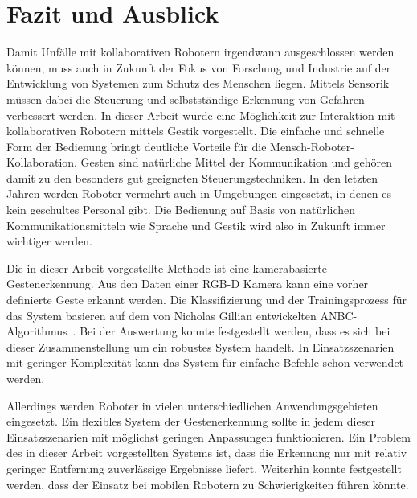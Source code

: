 \chapter{Fazit und Ausblick}
Damit Unfälle mit kollaborativen Robotern irgendwann ausgeschlossen werden können, muss auch in Zukunft der Fokus von Forschung und Industrie auf der Entwicklung von Systemen zum Schutz des Menschen liegen. Mittels Sensorik müssen dabei die Steuerung und selbstständige Erkennung von Gefahren verbessert werden. In dieser Arbeit wurde eine Möglichkeit zur Interaktion mit kollaborativen Robotern mittels Gestik vorgestellt. Die einfache und schnelle Form der Bedienung bringt deutliche Vorteile für die Mensch-Roboter-Kollaboration. Gesten sind natürliche Mittel der Kommunikation und gehören damit zu den besonders gut geeigneten Steuerungstechniken. In den letzten Jahren werden Roboter vermehrt auch in Umgebungen eingesetzt, in denen es kein geschultes Personal gibt. Die Bedienung auf Basis von natürlichen Kommunikationsmitteln wie Sprache und Gestik wird also in Zukunft immer wichtiger werden. 

Die in dieser Arbeit vorgestellte Methode ist eine kamerabasierte Gestenerkennung. Aus den Daten einer RGB-D Kamera kann eine vorher definierte Geste erkannt werden. Die Klassifizierung und der Trainingsprozess für das System basieren auf dem von Nicholas Gillian entwickelten ANBC-Algorithmus~\cite{gillianANBC}. Bei der Auswertung konnte festgestellt werden, dass es sich bei dieser Zusammenstellung um ein robustes System handelt. In Einsatzszenarien mit geringer Komplexität kann das System für einfache Befehle schon verwendet werden.

Allerdings werden Roboter in vielen unterschiedlichen Anwendungsgebieten eingesetzt. Ein flexibles System der Gestenerkennung sollte in jedem dieser Einsatzszenarien mit möglichst geringen Anpassungen funktionieren. Ein Problem des in dieser Arbeit vorgestellten Systems ist, dass die Erkennung nur mit relativ geringer Entfernung zuverlässige Ergebnisse liefert. Weiterhin konnte festgestellt werden, dass der Einsatz bei mobilen Robotern zu Schwierigkeiten führen könnte.

